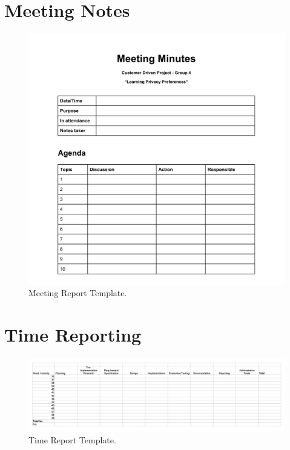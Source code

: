 \section{Meeting Notes}
\begin{figure}[hbp]
\begin{center}
\includegraphics[width = \textwidth/3*2]{Appendix/meetingreportTemp.jpg}
\caption{Meeting Report Template.}
\label{MeetingReportTemplate}
\end{center}
\end{figure}
\newpage

\section{Time Reporting}
\begin{figure}[hbp]
\begin{center}
\includegraphics[width = \textwidth]{Appendix/timereportTemp.jpg}
\caption{Time Report Template.}
\label{TimeReportTemplate}
\end{center}
\end{figure}


